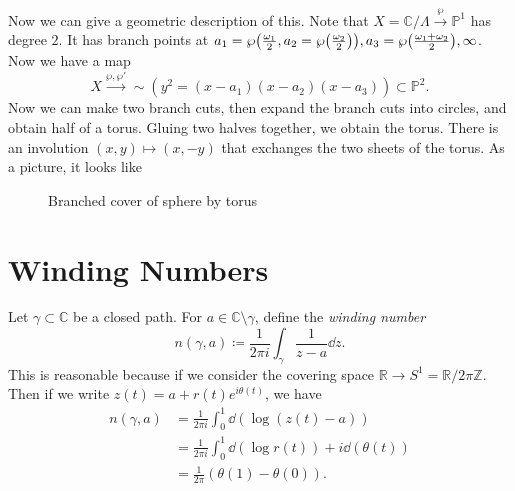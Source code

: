 \documentclass[leqno, openany]{memoir}
\theoremstyle{definition}
\theoremstyle{remark}
\theoremstyle{plain}
\theoremstyle{definition}
\theoremstyle{remark}
\newcommand{\R}{\mathbb{R}}
\newcommand{\C}{\mathbb{C}}
\newcommand{\Z}{\mathbb{Z}}
\renewcommand{\P}{\mathbb{P}}
\begin{document}
Now we can give a geometric description of this. Note that $X = \C/\Lambda \xrightarrow{\wp} \P^1$ has degree $2$. It has branch points at $a_1 = \wp\qty(\frac{\omega_1}{2}, a_2 = \wp\qty(\frac{\omega_2}{2})), a_3 = \wp\qty(\frac{\omega_1 + \omega_2}{2}), \infty$. Now we have a map
\[ X \xrightarrow{\wp, \wp'}{\sim} (y^2 = (x-a_1)(x-a_2)(x-a_3)) \subset \P^2. \]
Now we can make two branch cuts, then expand the branch cuts into circles, and obtain half of a torus. Gluing two halves together, we obtain the torus. There is an involution $(x,y) \mapsto (x,-y)$ that exchanges the two sheets of the torus. As a picture, it looks like
\begin{figure}[H]
\begin{center}
\end{center}
\caption{Branched cover of sphere by torus}%
\label{fig:branched-cover-sphere-by}
\end{figure}

\section{Winding Numbers}%
\label{sec:winding_numbers}

Let $\gamma \subset \C$ be a closed path. For $a \in \C \setminus \gamma$, define the \textit{winding number}
\[ n(\gamma, a) \coloneqq \frac{1}{2 \pi i} \int_{\gamma} \frac{1}{z-a} \dd{z}. \]
This is reasonable because if we consider the covering space $\R \to S^1 = \R/2 \pi \Z$. Then if we write $z(t) = a + r(t) e^{i \theta(t)}$, we have
\begin{align*}
    n(\gamma, a) &= \frac{1}{2 \pi i} \int_0^1 \dd(\log(z(t) - a)) \\
                 &= \frac{1}{2 \pi i} \int_0^1 \dd(\log r(t)) + i \dd(\theta(t)) \\
                 &= \frac{1}{2 \pi} (\theta(1) - \theta(0)).
\end{align*}
\end{document}

